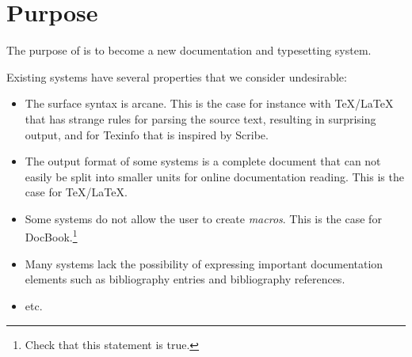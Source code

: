 \chapter{Purpose}
\label{chap-purpose}

The purpose of \sysname{} is to become a new documentation and
typesetting system.

Existing systems have several properties that we consider
undesirable:

\begin{itemize}
\item The surface syntax is arcane.  This is the case for instance
  with TeX/LaTeX that has strange rules for parsing the source text,
  resulting in surprising output, and for Texinfo that is inspired by
  Scribe.
\item The output format of some systems is a complete document that
  can not easily be split into smaller units for online documentation
  reading.  This is the case for TeX/LaTeX.
\item Some systems do not allow the user to create \emph{macros}.
  This is the case for DocBook.\footnote{Check that this statement is
    true.} 
\item Many systems lack the possibility of expressing important
  documentation elements such as bibliography entries and bibliography
  references.
\item etc.
\end{itemize}

